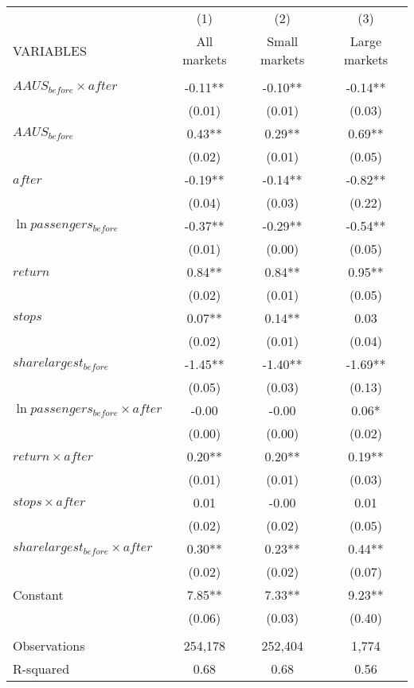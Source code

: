 \begin{tabular}{lccc} \hline
 & (1) & (2) & (3) \\
VARIABLES & All markets & Small markets & Large markets \\ \hline
 &  &  &  \\
$ AAUS_{before} \times after $ & -0.11** & -0.10** & -0.14** \\
 & (0.01) & (0.01) & (0.03) \\
$ AAUS_{before} $ & 0.43** & 0.29** & 0.69** \\
 & (0.02) & (0.01) & (0.05) \\
$ after $ & -0.19** & -0.14** & -0.82** \\
 & (0.04) & (0.03) & (0.22) \\
$ \ln passengers_{before} $ & -0.37** & -0.29** & -0.54** \\
 & (0.01) & (0.00) & (0.05) \\
$ return $ & 0.84** & 0.84** & 0.95** \\
 & (0.02) & (0.01) & (0.05) \\
$ stops $ & 0.07** & 0.14** & 0.03 \\
 & (0.02) & (0.01) & (0.04) \\
$ sharelargest_{before} $ & -1.45** & -1.40** & -1.69** \\
 & (0.05) & (0.03) & (0.13) \\
$ \ln passengers_{before} \times after $ & -0.00 & -0.00 & 0.06* \\
 & (0.00) & (0.00) & (0.02) \\
$ return \times after $ & 0.20** & 0.20** & 0.19** \\
 & (0.01) & (0.01) & (0.03) \\
$ stops \times after $ & 0.01 & -0.00 & 0.01 \\
 & (0.02) & (0.02) & (0.05) \\
$ sharelargest_{before} \times after $ & 0.30** & 0.23** & 0.44** \\
 & (0.02) & (0.02) & (0.07) \\
Constant & 7.85** & 7.33** & 9.23** \\
 & (0.06) & (0.03) & (0.40) \\
 &  &  &  \\
Observations & 254,178 & 252,404 & 1,774 \\
 R-squared & 0.68 & 0.68 & 0.56 \\ \hline
\end{tabular}

